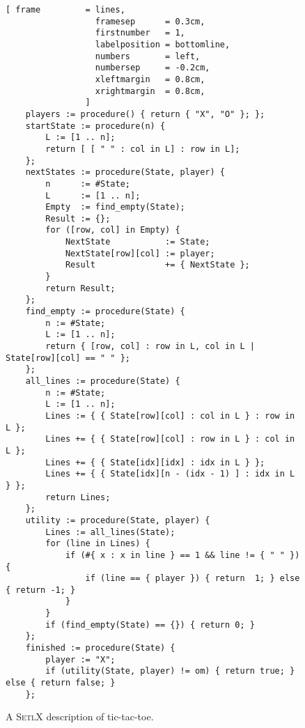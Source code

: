 \begin{figure}[!ht]
\centering
\begin{Verbatim}[ frame         = lines, 
                  framesep      = 0.3cm, 
                  firstnumber   = 1,
                  labelposition = bottomline,
                  numbers       = left,
                  numbersep     = -0.2cm,
                  xleftmargin   = 0.8cm,
                  xrightmargin  = 0.8cm,
                ]
    players := procedure() { return { "X", "O" }; };
    startState := procedure(n) {
        L := [1 .. n];
        return [ [ " " : col in L] : row in L];
    };
    nextStates := procedure(State, player) {
        n      := #State;
        L      := [1 .. n];
        Empty  := find_empty(State);
        Result := {};
        for ([row, col] in Empty) {
            NextState           := State;
            NextState[row][col] := player;
            Result              += { NextState };
        }
        return Result;
    };
    find_empty := procedure(State) {
        n := #State;
        L := [1 .. n];
        return { [row, col] : row in L, col in L | State[row][col] == " " };
    };
    all_lines := procedure(State) {
        n := #State;
        L := [1 .. n];
        Lines := { { State[row][col] : col in L } : row in L };
        Lines += { { State[row][col] : row in L } : col in L };
        Lines += { { State[idx][idx] : idx in L } };
        Lines += { { State[idx][n - (idx - 1) ] : idx in L } };
        return Lines;
    };
    utility := procedure(State, player) {
        Lines := all_lines(State);
        for (line in Lines) {
            if (#{ x : x in line } == 1 && line != { " " }) {
                if (line == { player }) { return  1; } else { return -1; }
            }
        }
        if (find_empty(State) == {}) { return 0; }
    };
    finished := procedure(State) {
        player := "X";
        if (utility(State, player) != om) { return true; } else { return false; }
    };
\end{Verbatim}
\vspace*{-0.3cm}
\caption{A \textsc{SetlX} description of tic-tac-toe.}
\label{fig:ttt.stlx}
\end{figure}
 
